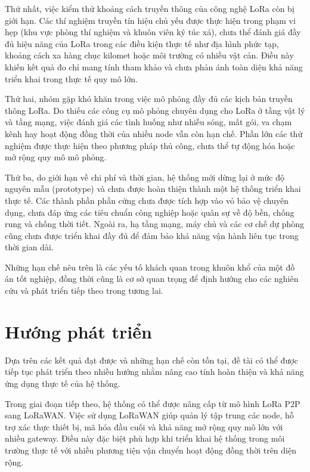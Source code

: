 Thứ nhất, việc kiểm thử khoảng cách truyền thông của công nghệ LoRa còn bị giới hạn. Các thí nghiệm truyền tín hiệu chủ yếu được thực hiện trong phạm vi hẹp (khu vực phòng thí nghiệm và khuôn viên ký túc xá), chưa thể đánh giá đầy đủ hiệu năng của LoRa trong các điều kiện thực tế như địa hình phức tạp, khoảng cách xa hàng chục kilomet hoặc môi trường có nhiều vật cản. Điều này khiến kết quả đo chỉ mang tính tham khảo và chưa phản ánh toàn diện khả năng triển khai trong thực tế quy mô lớn.

Thứ hai, nhóm gặp khó khăn trong việc mô phỏng đầy đủ các kịch bản truyền thông LoRa. Do thiếu các công cụ mô phỏng chuyên dụng cho LoRa ở tầng vật lý và tầng mạng, việc đánh giá các tình huống như nhiễu sóng, mất gói, va chạm kênh hay hoạt động đồng thời của nhiều node vẫn còn hạn chế. Phần lớn các thử nghiệm được thực hiện theo phương pháp thủ công, chưa thể tự động hóa hoặc mở rộng quy mô mô phỏng.

Thứ ba, do giới hạn về chi phí và thời gian, hệ thống mới dừng lại ở mức độ nguyên mẫu (prototype) và chưa được hoàn thiện thành một hệ thống triển khai thực tế. Các thành phần phần cứng chưa được tích hợp vào vỏ bảo vệ chuyên dụng, chưa đáp ứng các tiêu chuẩn công nghiệp hoặc quân sự về độ bền, chống rung và chống thời tiết. Ngoài ra, hạ tầng mạng, máy chủ và các cơ chế dự phòng cũng chưa được triển khai đầy đủ để đảm bảo khả năng vận hành liên tục trong thời gian dài.

Những hạn chế nêu trên là các yếu tố khách quan trong khuôn khổ của một đồ án tốt nghiệp, đồng thời cũng là cơ sở quan trọng để định hướng cho các nghiên cứu và phát triển tiếp theo trong tương lai.

\section{Hướng phát triển}

Dựa trên các kết quả đạt được và những hạn chế còn tồn tại, đề tài có thể được tiếp tục phát triển theo nhiều hướng nhằm nâng cao tính hoàn thiện và khả năng ứng dụng thực tế của hệ thống.

Trong giai đoạn tiếp theo, hệ thống có thể được nâng cấp từ mô hình LoRa P2P sang LoRaWAN. Việc sử dụng LoRaWAN giúp quản lý tập trung các node, hỗ trợ xác thực thiết bị, mã hóa đầu cuối và khả năng mở rộng quy mô lớn với nhiều gateway. Điều này đặc biệt phù hợp khi triển khai hệ thống trong môi trường thực tế với nhiều phương tiện vận chuyển hoạt động đồng thời trên diện rộng.


